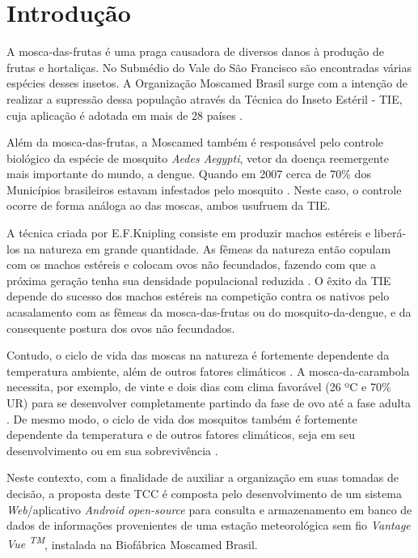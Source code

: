 \chapter{Introdução}

A mosca-das-frutas é uma praga causadora de diversos danos à produção de frutas e hortaliças. No Submédio do Vale do São Francisco são encontradas várias espécies desses insetos. A Organização Moscamed Brasil surge com a intenção de realizar a supressão dessa população através da Técnica do Inseto Estéril - TIE, cuja aplicação é adotada em mais de 28 países \cite{MOSCAMEDINST2003}. 

Além da mosca-das-frutas, a Moscamed também é responsável pelo controle biológico da espécie de mosquito \textit{Aedes Aegypti}, vetor da doença reemergente mais importante do mundo, a dengue. Quando em 2007 cerca de 70\% dos Municípios brasileiros estavam infestados pelo mosquito \cite{BRAGA2007}. Neste caso, o controle ocorre de forma análoga ao das moscas, ambos usufruem da TIE.

A técnica criada por E.F.Knipling consiste em produzir machos estéreis e liberá-los na natureza em grande quantidade. As fêmeas da natureza então copulam com os machos estéreis e colocam ovos não fecundados, fazendo com que a próxima geração tenha sua densidade populacional reduzida \cite{paranhos2008moscas}. O êxito da TIE depende do sucesso dos machos estéreis na competição contra os nativos pelo acasalamento com as fêmeas da mosca-das-frutas ou do mosquito-da-dengue, e da consequente postura dos ovos não fecundados.

Contudo, o ciclo de vida das moscas na natureza é fortemente dependente da temperatura ambiente, além de outros fatores climáticos \cite{raga2000manejo}. A mosca-da-carambola necessita, por exemplo, de vinte e dois dias com clima favorável (26 ºC e 70\% UR) para se desenvolver completamente partindo da fase de ovo até a fase adulta \cite{malavasi2000moscas}. De mesmo modo, o ciclo de vida dos mosquitos também é fortemente dependente da temperatura e de outros fatores climáticos, seja em seu desenvolvimento ou em sua sobrevivência \cite{hopp2001global, ribeiro2006associaccao}.

Neste contexto, com a finalidade de auxiliar a organização em suas tomadas de decisão, a proposta deste TCC é composta pelo desenvolvimento de um sistema \textit{Web}/aplicativo \textit{Android open-source} para consulta e armazenamento em banco de dados de informações provenientes de uma estação meteorológica sem fio \textit{Vantage Vue \textsuperscript{TM}}, instalada na Biofábrica Moscamed Brasil.


